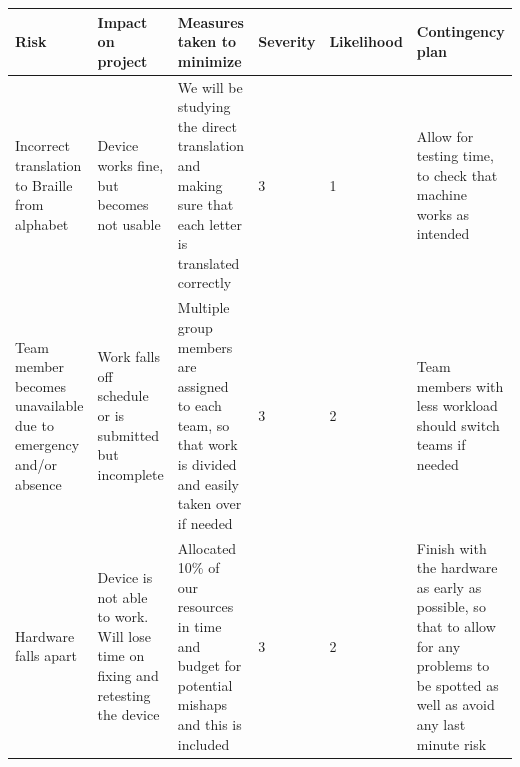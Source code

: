 \documentclass{article}
\begin{document}
\begin{table}[h]
\begin{center}
\begin{small}
\begin{tabular}{|p{3cm}|p{3cm}|p{3cm}|p{1cm}|p{1.2cm}|p{3cm}|}
\hline
\rowcolor[HTML]{C0C0C0} 
Risk                                                                                              & Impact on project                                                                                               & Measures taken to minimize                                                                                                                                                                                & Severity & Likelihood & Contingency plan                                                                                                                                  \\ \hline
Incorrect translation to Braille from alphabet                                                    & Device works fine, but becomes not usable                                                                       & We will be studying the direct translation and making sure that each letter is translated correctly                                                                                                       & 3        & 1          & Allow for testing time, to check that machine works as intended                                                                                   \\ \hline
Team member becomes unavailable due to emergency and/or absence                                   & Work falls off schedule or is submitted but incomplete                                                          & Multiple group members are assigned to each team, so that work is divided and easily taken over if needed                                                                                                 & 3        & 2          & Team members with less workload should switch teams if needed                                                                                     \\ \hline
Hardware falls apart                                                                              & Device is not able to work. Will lose time on fixing and retesting the device                                   & Allocated 10\% of our resources in time and budget for potential mishaps and this is included                                                                                                             & 3        & 2          & Finish with the hardware as early as possible, so that to allow for any problems to be spotted as well as avoid any last minute risk              \\ \hline

\end{tabular}
\end{small}
\end{center}
\end{table}
\end{document}
